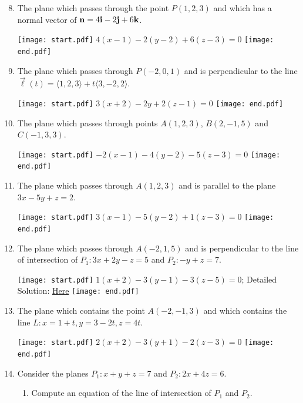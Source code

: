 \documentclass[12pt]{article}
\begin{document}

\begin{enumerate}
\setcounter{enumi}{7}

\item The plane which passes through the point $P(1,2,3)$ and which has a normal vector of ${\bf n}=4{\bf i}-2{\bf j}+6{\bf k}$.

\texttt{[image: start.pdf]}
{{$4(x-1)-2(y-2)+6(z-3)=0$}}
\texttt{[image: end.pdf]}


\item The plane which passes through $P(-2,0,1)$ and is perpendicular to the line $\overrightarrow{\ell}(t)=\langle 1,2,3 \rangle +t \langle 3,-2,2\rangle$.

\texttt{[image: start.pdf]}
{{$3(x+2)-2y+2(z-1)=0$}}
\texttt{[image: end.pdf]}


\item The plane which passes through points $A(1,2,3)$, $B(2,-1,5)$ and $C(-1,3,3)$.

\texttt{[image: start.pdf]}
{{$-2(x-1)-4(y-2)-5(z-3)=0$}}
\texttt{[image: end.pdf]}


\item The plane which passes through $A(1,2,3)$ and is parallel to the plane $3x-5y+z=2$.

\texttt{[image: start.pdf]}
{{$3(x-1)-5(y-2)+1(z-3)=0$}}
\texttt{[image: end.pdf]}


\item The plane which passes through $A(-2,1,5)$ and is perpendicular to the line of intersection of $P_1: 3x+2y-z=5$ and $P_2: -y+z=7$.

\texttt{[image: start.pdf]}
{{$1(x+2)-3(y-1)-3(z-5)=0$; Detailed Solution: \textcolor{blue}{\href{http://www.math.drexel.edu/classes/Calculus/resources/Math200HW/Solutions/06_200_Planes_12.pdf}{Here}}}}
\texttt{[image: end.pdf]}


\item The plane which contains the point $A(-2,-1,3)$ and which contains the line $L: x=1+t, y=3-2t, z=4t$.

\texttt{[image: start.pdf]}
{{$2(x+2)-3(y+1)-2(z-3)=0$}}
\texttt{[image: end.pdf]}


\item Consider the planes $P_1: x+y+z=7$ and $P_2: 2x+4z=6$.

\begin{enumerate}

\item Compute an equation of the line of intersection of $P_1$ and $P_2$.


\end{enumerate}
\end{enumerate}
\end{document}
